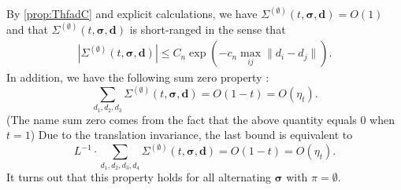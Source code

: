 \documentclass[10pt,reqno]{article}
\theoremstyle{plain} %
\theoremstyle{remark}
\numberwithin{equation}{section}
\begin{document}
By \eqref{prop:ThfadC} and  explicit calculations,   we have 
$\Sigma^{(\emptyset)}(t, \boldsymbol{\sigma}, \textbf{d}) =O(1) $
and  that $\Sigma^{(\emptyset)}(t, \boldsymbol{\sigma}, \textbf{d})$ is short-ranged in the sense that 
\begin{align}\label{res_SIGempdd}
  \left|\Sigma^{(\emptyset)}(t, \boldsymbol{\sigma}, \textbf{d})\right|\le C_n\exp\left(-c_n \max_{ij}\|d_i-d_j\|\right)   .
\end{align}
In addition,  we have the following sum zero property :
\[
\sum_{d_1, d_2, d_3} \Sigma^{(\emptyset)}(t, \boldsymbol{\sigma}, \textbf{d}) = O(1-t) = O(\eta_t).
\]  
(The name sum zero comes from the fact that the above quantity equals $0$ when $t=1$) 
Due to the translation invariance, the last  bound  is equivalent to 
\[
L^{-1} \cdot \sum_{d_1, d_2, d_3, d_4} \Sigma^{(\emptyset)}(t, \boldsymbol{\sigma}, \textbf{d}) = O(1-t) = O(\eta_t).
\] 
It turns out that this property holds  for all alternating  $\boldsymbol{\sigma}$ with  $\pi=\emptyset$.  
\end{document}
